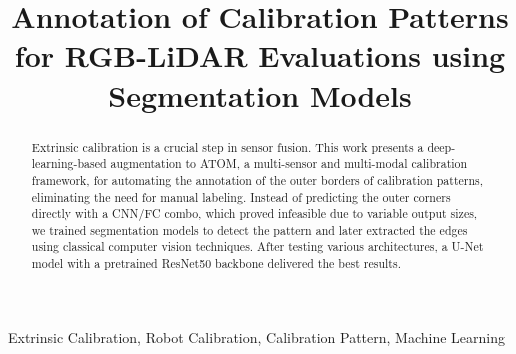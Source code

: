 \documentclass[conference]{IEEEtran}
\begin{document}
\title{Annotation of Calibration Patterns for RGB-LiDAR Evaluations using Segmentation Models\\
{}
}

\author{
\and
{}
}

\maketitle

\begin{abstract}
    Extrinsic calibration is a crucial step in sensor fusion. This work presents a deep-learning-based augmentation to ATOM, a
    multi-sensor and multi-modal calibration framework, for automating the annotation of the outer borders of calibration patterns,
    eliminating the need for manual labeling. Instead of predicting the outer corners directly with a CNN/FC combo, which proved
    infeasible due to variable output sizes, we trained segmentation models to detect the pattern and later extracted the edges using
  classical computer vision techniques. After testing various architectures, a U-Net model with a pretrained ResNet50 backbone delivered
  the best results.
\end{abstract}

\begin{IEEEkeywords}
Extrinsic Calibration, Robot Calibration, Calibration Pattern, Machine Learning
\end{IEEEkeywords}










\end{document}
